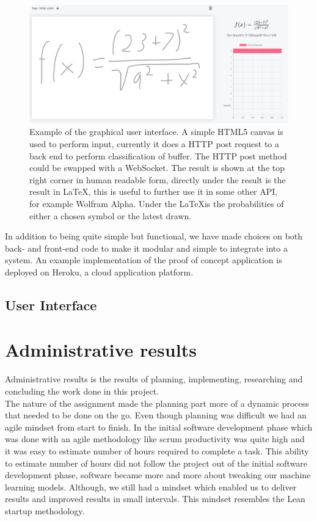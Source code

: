 % 
\begin{figure}[H]
    \centering
    \includegraphics[width=\textwidth]{Assets/Chapter4_Result/predictor_example.png}
    \caption{Example of the graphical user interface. A simple HTML5 canvas is used to perform input, currently it does a HTTP post request to a back end to perform classification of buffer. The HTTP post method could be swapped with a WebSocket. The result is shown at the top right corner in human readable form, directly under the result is the result in \LaTeX, this is useful to further use it in some other API, for example Wolfram Alpha. Under the \LaTeX  is the probabilities of either a chosen symbol or the latest drawn.}
    \label{fig:predictor_example}
\end{figure}
In addition to being quite simple but functional, we have made choices on both back- and front-end code to make it modular and simple to integrate into a system. An example implementation of the proof of concept application is deployed on Heroku, a cloud application platform.

\subsection{User Interface}




\section{Administrative results} %
Administrative results is the results of planning, implementing, researching and concluding the work done in this project.\\ The nature of the assignment made the planning part more of a dynamic process that needed to be done on the go. Even though planning was difficult we had an agile mindset from start to finish. In the initial software development phase which was done with an agile methodology like scrum productivity was quite high and it was easy to estimate number of hours required to complete a task. This ability to estimate number of hours did not follow the project out of the initial software development phase, software became more and more about tweaking our machine learning models. Although, we still had a mindset which enabled us to deliver results and improved results in small intervals. This mindset resembles the Lean startup methodology. %

